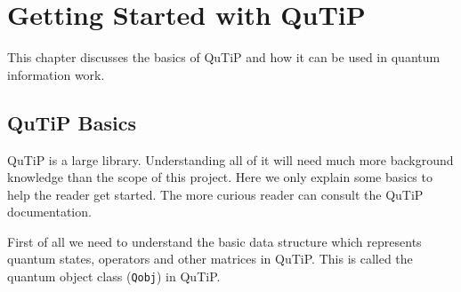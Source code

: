 \chapter{Getting Started with QuTiP}

\par This chapter discusses the basics of QuTiP and how it can be used in quantum information work.

\section{QuTiP Basics}
QuTiP is a large library. Understanding all of it will need much more background knowledge than the scope of this project. Here we only explain some basics to help the reader get started. The more curious reader can consult the QuTiP documentation. \cite{qutipdoc}
\par First of all we need to understand the basic data structure which represents quantum states, operators and other matrices in QuTiP. This is called the quantum object class (\texttt{Qobj}) in QuTiP.

